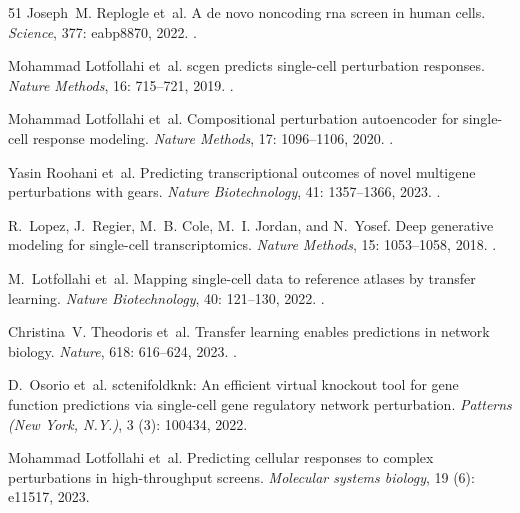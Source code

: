 \documentclass[10pt]{article}
\begin{document}
\begin{thebibliography}{51}
Joseph~M. Replogle et~al.
\newblock A de novo noncoding rna screen in human cells.
\newblock \emph{Science}, 377: eabp8870, 2022{}.
\newblock {}.

Mohammad Lotfollahi et~al.
\newblock scgen predicts single-cell perturbation responses.
\newblock \emph{Nature Methods}, 16: 715--721, 2019.
\newblock {}.

Mohammad Lotfollahi et~al.
\newblock Compositional perturbation autoencoder for single-cell response
  modeling.
\newblock \emph{Nature Methods}, 17: 1096--1106, 2020.
\newblock {}.

Yasin Roohani et~al.
\newblock Predicting transcriptional outcomes of novel multigene perturbations
  with gears.
\newblock \emph{Nature Biotechnology}, 41: 1357--1366, 2023.
\newblock {}.

R.~Lopez, J.~Regier, M.~B. Cole, M.~I. Jordan, and N.~Yosef.
\newblock Deep generative modeling for single-cell transcriptomics.
\newblock \emph{Nature Methods}, 15: 1053--1058, 2018.
\newblock {}.

M.~Lotfollahi et~al.
\newblock Mapping single-cell data to reference atlases by transfer learning.
\newblock \emph{Nature Biotechnology}, 40: 121--130, 2022.
\newblock {}.

Christina~V. Theodoris et~al.
\newblock Transfer learning enables predictions in network biology.
\newblock \emph{Nature}, 618: 616--624, 2023.
\newblock {}.

D.~Osorio et~al.
\newblock sctenifoldknk: An efficient virtual knockout tool for gene function
  predictions via single-cell gene regulatory network perturbation.
\newblock \emph{Patterns (New York, N.Y.)}, 3 (3): 100434,
  2022.

Mohammad Lotfollahi et~al.
\newblock Predicting cellular responses to complex perturbations in
  high-throughput screens.
\newblock \emph{Molecular systems biology}, 19 (6): e11517,
  2023.


\end{thebibliography}
\end{document}
